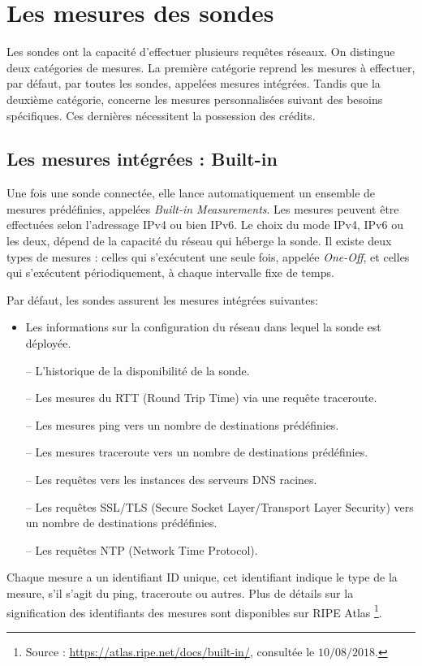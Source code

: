 
\section{Les mesures des sondes}
Les sondes ont la capacité d'effectuer plusieurs requêtes  réseaux. On distingue deux catégories de mesures. La première catégorie reprend les mesures à effectuer, par défaut, par toutes les sondes, appelées  mesures intégrées. Tandis que la deuxième catégorie, concerne les mesures personnalisées suivant des besoins spécifiques. Ces dernières nécessitent la possession des crédits.
\subsection{Les mesures intégrées : Built-in } \label{par:whatmesureripeatlas}
Une fois une sonde  connectée, elle lance automatiquement un ensemble de mesures prédéfinies, appelées \textit{Built-in Measurements}. Les mesures peuvent être effectuées selon l'adressage IPv4 ou bien IPv6. Le choix du mode  IPv4,  IPv6 ou les deux, dépend de la capacité du réseau qui héberge la sonde.  Il existe deux types de mesures :  celles qui   s'exécutent une seule fois, appelée  \textit{One-Off}, et celles qui s'exécutent   périodiquement, à chaque intervalle fixe de temps. 

Par défaut, les sondes  assurent les mesures intégrées  suivantes: 
\begin{itemize}
	\item Les informations sur la configuration du réseau dans lequel la sonde  est déployée.
	\item[--] L'historique de la disponibilité de la sonde.
	\item[--] Les mesures du  RTT (Round Trip Time) via une requête traceroute.
	\item[--] Les mesures ping vers un nombre de destinations prédéfinies.
	\item[--] Les mesures traceroute vers un nombre de destinations prédéfinies.
	\item[--] Les requêtes vers les instances des serveurs DNS  racines.
	\item[--] Les requêtes SSL/TLS (Secure Socket Layer/Transport Layer Security) vers un nombre de destinations prédéfinies.
	\item[--] Les requêtes NTP (Network Time Protocol).
\end{itemize}

Chaque mesure a un identifiant ID unique, cet identifiant indique le type de la mesure, s'il s'agit du ping, traceroute ou autres. Plus de détails sur la signification des identifiants des mesures sont disponibles sur RIPE Atlas \footnote{Source : \url{https://atlas.ripe.net/docs/built-in/}, consultée le $10/08/2018$.}.
